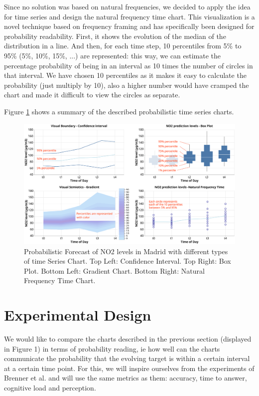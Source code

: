 \documentclass[a4paper,3p,sort&compress]{elsarticle}
\begin{document}
Since no solution was based on natural frequencies, we decided to apply the idea for time series and design the natural frequency time chart.
This visualization is a novel technique based on frequency framing and has 
specifically been designed for probability readability. First, 
it shows the evolution of the median of the distribution in a line. And then, for each time 
step, 10 percentiles from 5\% to 95\% (5\%, 10\%, 15\%, ...) are represented: this way, we can estimate the percentage 
probability of being in an interval as 10 times the number of circles in that interval. 
We have chosen 10 percentiles as it makes it easy to calculate the probability (just multiply by 10), also a higher number
would have cramped the chart and made it difficult to view the circles as separate. 

Figure \ref{figure:charts} shows a summary of the described probabilistic time series charts.

\begin{figure}
  \centering
  \includegraphics[width=.9\textwidth]{charts_vector} 
  \caption{\label{figure:charts} Probabilistic Forecast of NO2 levels in Madrid with different types of time Series Chart. 
  Top Left: Confidence Interval. Top Right: Box Plot. 
  Bottom Left: Gradient Chart. Bottom Right: Natural Frequency Time Chart. }
\end{figure} 

\section{Experimental Design}
\label{sec:exp_design}

We would like to compare the charts described in the previous section (displayed in Figure 1) 
in terms of probability 
reading, ie how well 
can the charts communicate the probability that the evolving target is within a certain interval 
at a certain time point.
 For this, we will inspire ourselves from the experiments of Brenner et al. 
and will use the same metrics 
as them: accuracy, time to answer, cognitive load and perception. 
\end{document}
